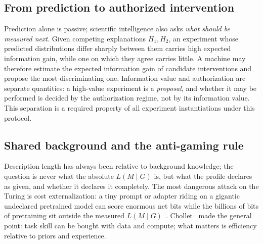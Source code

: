 \documentclass[11pt]{article}
\begin{document}
\subsection{From prediction to authorized intervention}

Prediction alone is passive; scientific intelligence also asks \textit{what should be measured next}. Given competing explanations \(H_1, H_2\), an experiment whose predicted distributions differ sharply between them carries high expected information gain, while one on which they agree carries little. A machine may therefore estimate the expected information gain of candidate interventions and propose the most discriminating one. Information value and authorization are separate quantities: a high-value experiment is a \textit{proposal}, and whether it may be performed is decided by the authorization regime, not by its information value. This separation is a required property of all experiment instantiations under this protocol.

\subsection{Shared background and the anti-gaming rule}

Description length has always been relative to background knowledge; the question is never what the absolute \(L(M\mid G)\) is, but what the profile declares as given, and whether it declares it completely. The most dangerous attack on the Turing is cost externalization: a tiny prompt or adapter riding on a gigantic undeclared pretrained model can score enormous net bits while the billions of bits of pretraining sit outside the measured \(L(M\mid G)\)~\cite{deletang2024}. Chollet~\cite{chollet2019} made the general point: task skill can be bought with data and compute; what matters is efficiency relative to priors and experience.
\end{document}
